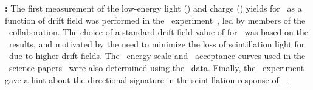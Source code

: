 \begin{compactitem}

\item {\bf \SCENE:} The first measurement of the low-energy light (\SCENERecoilsLightEnergyRange) and charge (\SCENERecoilsIonizationEnergyRange) yields for \NRs\ as a function of drift field was performed in the \SCENE\ experiment~\cite{Alexander:2013ke,Cao:2015ks}, led by members of the \DSf\ collaboration. The choice of a standard drift field value of \DSfDriftField for \DSfs\ was based on the \SCENE\ results, and motivated by the need to minimize the loss of scintillation light for \NRs\ due to higher drift fields. The \NR\ energy scale and \NR\ acceptance curves used in the \DSfs\ science papers~\cite{Agnes:2015gu,Agnes:2016fz} were also determined using the \SCENE\ data. Finally, the \SCENE\ experiment gave a hint about the directional signature in the scintillation response of \SCENERecoilsEnergyMax\ \NRs.




\end{compactitem}

